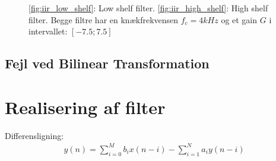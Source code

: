 \begin{figure}[h]
	\centering
	\caption{\ref{fig:iir_low_shelf}: Low shelf filter. \hspace{4cm} \ref{fig:iir_high_shelf}: High shelf filter. \newline Begge filtre har en knækfrekvensen $f_c = 4kHz$ og et gain $G$ i intervallet: $[-7.5 ; 7.5]$}
\end{figure}
\FloatBlock

\subsection{Fejl ved Bilinear Transformation}


\section{Realisering af filter}

    Differensligning:
    \begin{align}
    y(n) = \sum\limits_{i=0}^{M} b_i x(n-i) - \sum\limits_{i=1}^N a_i y(n-i)
    \end{align}


